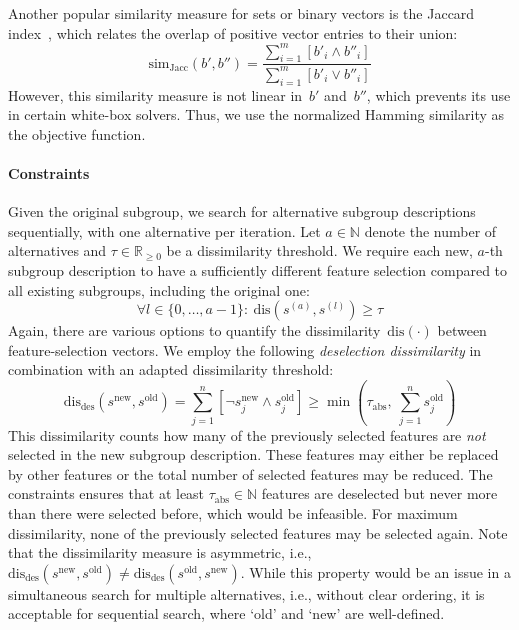 \documentclass{article}
\theoremstyle{definition}
\begin{document}
Another popular similarity measure for sets or binary vectors is the Jaccard index~\cite{choi2010survey}, which relates the overlap of positive vector entries to their union:
%
\begin{equation}
	\text{sim}_{\text{Jacc}}(b', b'') = \frac{\sum_{i=1}^{m} [b'_i \land b''_i ]}{\sum_{i=1}^{m} [b'_i \lor b''_i]}
	\label{eq:csd:jaccard}
\end{equation}
%
However, this similarity measure is not linear in~$b'$ and~$b''$, which prevents its use in certain white-box solvers.
Thus, we use the normalized Hamming similarity as the objective function.

\paragraph{Constraints}

Given the original subgroup, we search for alternative subgroup descriptions sequentially, with one alternative per iteration.
Let $a \in \mathbb{N}$ denote the number of alternatives and $\tau \in \mathbb{R}_{\geq 0}$ be a dissimilarity threshold.
We require each new, $a$-th subgroup description to have a sufficiently different feature selection compared to all {existing subgroups}, including the original one:
%
\begin{equation}
	\forall l \in \{0, \dots, a-1\}:~ \text{dis}(s^{(a)}, s^{(l)}) \geq \tau
	\label{eq:csd:constraint-dissimilarity-general}
\end{equation}
%
Again, there are various options to quantify the dissimilarity~$\text{dis}(\cdot)$ between feature-selection vectors.
We employ the following \emph{deselection dissimilarity} in combination with an adapted dissimilarity threshold:
%
\begin{equation}
	\text{dis}_{\text{des}}(s^{\text{new}}, s^{\text{old}}) = \sum_{j=1}^n [\lnot s^{\text{new}}_j \land s^{\text{old}}_j] \geq \min \left( \tau_{\text{abs}},~\sum_{j=1}^n s^{\text{old}}_j \right)
	\label{eq:csd:constraint-dissimilarity-special}
\end{equation}
%
This dissimilarity counts how many of the previously selected features are \emph{not} selected in the new subgroup description.
These features may either be replaced by other features or the total number of selected features may be reduced.
The constraints ensures that at least $\tau_{\text{abs}} \in \mathbb{N}$ features are deselected but never more than there were selected before, which would be infeasible.
For maximum dissimilarity, none of the previously selected features may be selected again.
Note that the dissimilarity measure is asymmetric, i.e., $\text{dis}_{\text{des}}(s^{\text{new}}, s^{\text{old}}) \neq \text{dis}_{\text{des}}(s^{\text{old}}, s^{\text{new}})$.
While this property would be an issue in a simultaneous search for multiple alternatives, i.e., without clear ordering, it is acceptable for sequential search, where `old' and `new' are well-defined.
\end{document}
